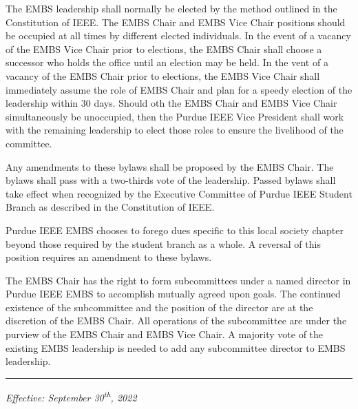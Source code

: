 \documentclass[12pt]{constitution}
\begin{document}
The EMBS leadership shall normally be elected by the method outlined in the Constitution of IEEE. The EMBS Chair and EMBS Vice Chair positions should be occupied at all times by different elected individuals. In the event of a vacancy of the EMBS Vice Chair prior to elections, the EMBS Chair shall choose a successor who holds the office until an election may be held. In the vent of a vacancy of the EMBS Chair prior to elections, the EMBS Vice Chair shall immediately assume the role of EMBS Chair and plan for a speedy election of the leadership within 30 days. Should oth the EMBS Chair and EMBS Vice Chair simultaneously be unoccupied, then the Purdue IEEE Vice President shall work with the remaining leadership to elect those roles to ensure the livelihood of the committee.

\label{art:amend}

Any amendments to these bylaws shall be proposed by the EMBS Chair. The bylaws shall pass with a two-thirds vote of the leadership. Passed bylaws shall take effect when recognized by the Executive Committee of Purdue IEEE Student Branch as described in the Constitution of IEEE.

\label{art:dues}

Purdue IEEE EMBS chooses to forego dues specific to this local society chapter beyond those required by the student branch as a whole. A reversal of this position requires an amendment to these bylaws.

\label{art:subcommittee}

The EMBS Chair has the right to form subcommittees under a named director in Purdue IEEE EMBS to accomplish mutually agreed upon goals. The continued existence of the subcommittee and the position of the director are at the discretion of the EMBS Chair. All operations of the subcommittee are under the purview of the EMBS Chair and EMBS Vice Chair. A majority vote of the existing EMBS leadership is needed to add any subcommittee director to EMBS leadership.

\vspace{12pt}
\hrule

\textit{Effective: September 30\textsuperscript{th}, 2022}


\setcounter{tocdepth}{1}
\end{document}
